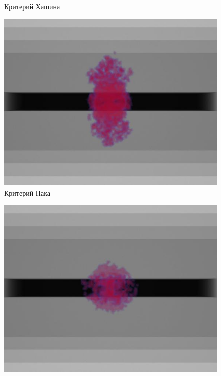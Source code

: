 \documentclass[xcolor={usenames,dvipsnames,svgnames,table}]{beamer}
\begin{document}
\begin{frame}
\begin{center}
\begin{minipage}[h]{0.30\textwidth}
\begin{figure}[h]
                \tiny
                \caption{Критерий Хашина}
            \end{figure}
        \end{minipage}
        \begin{minipage}[h]{0.30\textwidth}
            \begin{figure}[h]
                \includegraphics[width=\textwidth]{png/3-stringer-panel/stringer-puck.png}
                \tiny
                \caption{Критерий Пака}
            \end{figure}
        \end{minipage}
        \begin{minipage}[h]{0.30\textwidth}
            \begin{figure}[h]
                \includegraphics[width=\textwidth]{png/3-stringer-panel/stringer-tsai-hill.png}

\end{figure}
\end{minipage}
\end{center}
\end{frame}
\end{document}
